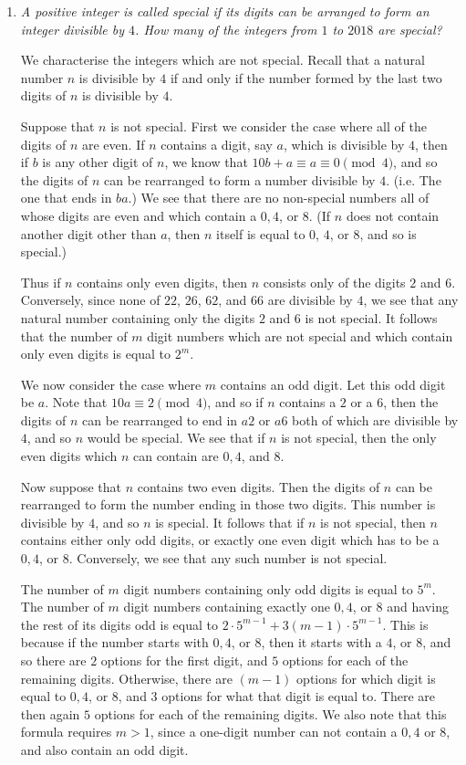 \documentclass[a4paper, 12pt]{article}
\begin{document}
\begin{enumerate}
\item {\itshape A positive integer is called special if its digits can be arranged to form an integer divisible by $4$. How many of the integers from $1$ to $2018$ are special?}

We characterise the integers which are not special. Recall that a natural number $n$ is divisible by $4$ if and only if the number formed by the last two digits of $n$ is divisible by $4$.

Suppose that $n$ is not special. First we consider the case where all of the digits of $n$ are even. If $n$ contains a digit, say $a$, which is divisible by $4$, then if $b$ is any other digit of $n$, we know that $10b + a \equiv a \equiv 0 \pmod 4$, and so the digits of $n$ can be rearranged to form a number divisible by $4$. (i.e. The one that ends in $ba$.) We see that there are no non-special numbers all of whose digits are even and which contain a $0, 4$, or $8$. (If $n$ does not contain another digit other than $a$, then $n$ itself is equal to $0$, $4$, or $8$, and so is special.)

Thus if $n$ contains only even digits, then $n$ consists only of the digits $2$ and $6$. Conversely, since none of $22$, $26$, $62$, and $66$ are divisible by $4$, we see that any natural number containing only the digits $2$ and $6$ is not special. It follows that the number of $m$ digit numbers which are not special and which contain only even digits is equal to $2^m$.

We now consider the case where $m$ contains an odd digit. Let this odd digit be $a$. Note that $10a \equiv 2 \pmod 4$, and so if $n$ contains a $2$ or a $6$, then the digits of $n$ can be rearranged to end in $a2$ or $a6$ both of which are divisible by $4$, and so $n$ would be special. We see that if $n$ is not special, then the only even digits which $n$ can contain are $0, 4$, and $8$.

Now suppose that $n$ contains two even digits. Then the digits of $n$ can be rearranged to form the number ending in those two digits. This number is divisible by $4$, and so $n$ is special. It follows that if $n$ is not special, then $n$ contains either only odd digits, or exactly one even digit which has to be a $0, 4$, or $8$. Conversely, we see that any such number is not special.

The number of $m$ digit numbers containing only odd digits is equal to $5^m$. The number of $m$ digit numbers containing exactly one $0, 4$, or $8$ and having the rest of its digits odd is equal to $2 \cdot 5^{m-1} + 3(m - 1) \cdot 5^{m - 1}$. This is because if the number starts with $0, 4$, or $8$, then it starts with a $4$, or $8$, and so there are $2$ options for the first digit, and $5$ options for each of the remaining digits. Otherwise, there are $(m - 1)$ options for which digit is equal to $0, 4$, or $8$, and $3$ options for what that digit is equal to. There are then again $5$ options for each of the remaining digits. We also note that this formula requires $m > 1$, since a one-digit number can not contain a $0, 4$ or $8$, and also contain an odd digit.


\end{enumerate}
\end{document}
